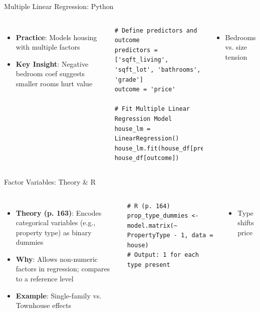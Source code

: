 \documentclass{beamer}
\begin{document}
	
	\begin{frame}[fragile]{Multiple Linear Regression: Python}
		\lstset{language=Python}
		\begin{columns}
			\begin{itemize}
				\item \textbf{Practice}: Models housing with multiple factors
				\item \textbf{Key Insight}: Negative bedroom coef suggests smaller rooms hurt value
			\end{itemize}
			\begin{lstlisting}
# Define predictors and outcome
predictors = ['sqft_living', 'sqft_lot', 'bathrooms', 'grade']
outcome = 'price'

# Fit Multiple Linear Regression Model
house_lm = LinearRegression()
house_lm.fit(house_df[predictors], house_df[outcome])

			\end{lstlisting}
			\begin{itemize}
				\item Bedrooms vs. size tension
			\end{itemize}
		\end{columns}
	\end{frame}
	
	\begin{frame}[fragile]{Factor Variables: Theory \& R}
		\begin{columns}
			\column{0.6\textwidth}
			\begin{itemize}
				\item \textbf{Theory (p. 163)}: Encodes categorical variables (e.g., property type) as binary dummies
				\item \textbf{Why}: Allows non-numeric factors in regression; compares to a reference level
				\item \textbf{Example}: Single-family vs. Townhouse effects
			\end{itemize}
			\begin{lstlisting}
# R (p. 164)
prop_type_dummies <- model.matrix(~ PropertyType - 1, data = house)
# Output: 1 for each type present
			\end{lstlisting}
			\column{0.4\textwidth}
			\begin{itemize}
				\item Type shifts price
			\end{itemize}
		\end{columns}
	\end{frame}
	
\end{document}
